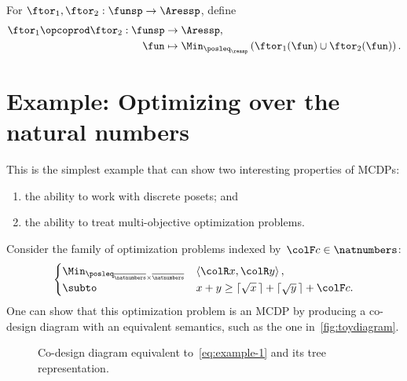 \begin{definition}
  \label{def:opcoprod}For $\ftor_{1},\ftor_{2}:\funsp\rightarrow\Aressp$,
  define
  \begin{align*}
    \ftor_{1}\opcoprod\ftor_{2}:\funsp & \rightarrow\Aressp,\\
    \fun& \mapsto\Min_{\posleq_{\ressp}}\left(\ftor_{1}(\fun)\cup\ftor_{2}(\fun)\right).
  \end{align*}
\end{definition}

\section{Example: Optimizing over the natural numbers}

This is the simplest example that can show two interesting properties
of MCDPs:
\begin{enumerate}
  \item the ability to work with discrete posets; and
  \item the ability to treat multi-objective optimization problems.
\end{enumerate}
Consider the family of optimization problems indexed by~${\colF c}\in\natnumbers$:
\begin{equation}
  \begin{cases}
    \Min_{\posleq_{\overline{\natnumbers}\times\overline{\natnumbers}}} & \left\langle {\colR x},{\colR y}\right\rangle ,\\
    \subto & x+y\geq\lceil\sqrt{x}\,\rceil+\lceil\sqrt{y}\,\rceil+{\colF c}.
  \end{cases}\label{eq:example-1}
\end{equation}
One can show that this optimization problem is an MCDP by producing
a co-design diagram with an equivalent semantics, such as the one
in~\cref{fig:toydiagram}.

\begin{figure}[h]

  \caption{Co-design diagram equivalent to~\cref{eq:example-1} and its tree representation.}
\end{figure}

